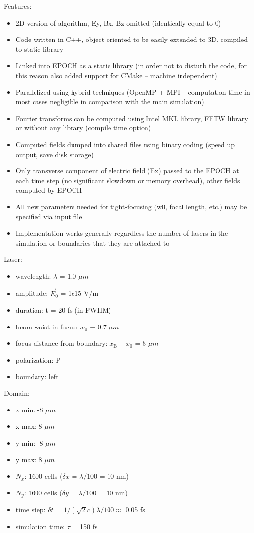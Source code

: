 \noindent
Features:
\begin{itemize}
	\item 2D version of algorithm, Ey, Bx, Bz omitted (identically equal to 0) 
	\item Code written in C++, object oriented to be easily extended to 3D, compiled to static library
	\item Linked into EPOCH as a static library (in order not to disturb the code, for this reason also added support for CMake – machine independent)
	\item Parallelized using hybrid techniques (OpenMP + MPI – computation time in most cases negligible in comparison with the main simulation)
	\item Fourier transforms can be computed using Intel MKL library, FFTW library or without any library (compile time option)
	\item Computed fields dumped into shared files using binary coding (speed up output, save disk storage)
	\item Only transverse component of electric field (Ex) passed to the EPOCH at each time step (no significant slowdown or memory overhead), other fields computed by EPOCH
	\item All new parameters needed for tight-focusing (w0, focal length, etc.) may be specified via input file
	\item Implementation works generally regardless the number of lasers in the simulation or boundaries that they are attached to
\end{itemize}

\noindent
Laser:
\begin{itemize}
\item wavelength: $ \lambda $ = 1.0 $ \mu m $
\item amplitude: $ \vec{E}_0 $ = 1e15 V/m
\item duration: t = 20 fs (in FWHM)
\item beam waist in focus: $ w_0 $ = 0.7 $ \mu m $
\item focus distance from boundary: $ x_\mathrm{B} - x_0 $ = 8 $ \mu m $
\item polarization: P
\item boundary: left 
\end{itemize}
Domain:
\begin{itemize}
\item x min: -8 $ \mu m $
\item x max: 8 $ \mu m $
\item y min: -8 $ \mu m $
\item y max: 8 $ \mu m $
\item $ N_x $: 1600 cells ($ \delta x $ = $ \lambda/100 $ = 10 nm)
\item $ N_y $: 1600 cells ($ \delta y $ = $ \lambda/100 $ = 10 nm)
\item time step: $ \delta t $ = $ 1/(\sqrt{2} c) \lambda /100 \approx $ 0.05 fs 
\item simulation time: $ \tau $ = 150 fs
\end{itemize}

